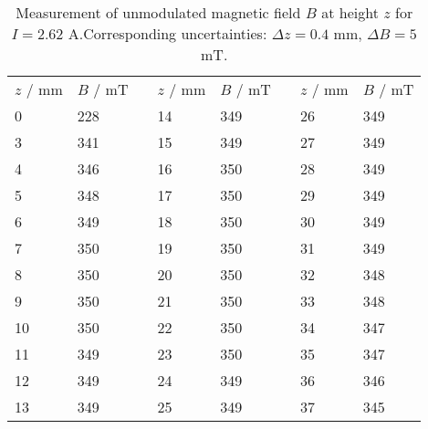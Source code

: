 \begin{table}[htdp]
\centering
    \begin{tabular}{|p{1.34cm}|p{2.16cm}|p{0.8cm}|p{1.34cm}|p{2.16cm}|p{0.8cm}|p{1.34cm}|p{2.16cm}|}
        \cline{1-2}\cline{4-5}\cline{7-8}
        $z$ / mm \cellcolor{LightCyan}& $B$ / mT \cellcolor{LightCyan}&&
        $z$ / mm \cellcolor{LightCyan}& $B$ / mT \cellcolor{LightCyan}&&
        $z$ / mm \cellcolor{LightCyan}& $B$ / mT \cellcolor{LightCyan}\\ 
        \cline{1-2}\cline{4-5}\cline{7-8}
        0 & 228 &&14 & 349 &&26 & 349 \\ 
        3 & 341 &&15 & 349 &&27 & 349 \\ 
        4 & 346 &&16 & 350 &&28 & 349 \\ 
        5 & 348 &&17 & 350 &&29 & 349 \\ 
        6 & 349 &&18 & 350 &&30 & 349 \\ 
        7 & 350 &&19 & 350 &&31 & 349 \\ 
        8 & 350 &&20 & 350 &&32 & 348 \\ 
        9 & 350 &&21 & 350 &&33 & 348 \\ 
        10 & 350 &&22 & 350 &&34 & 347 \\ 
        11 & 349 &&23 & 350 &&35 & 347 \\ 
        12 & 349 &&24 & 349 &&36 & 346 \\ 
        13 & 349 &&25 & 349 &&37 & 345 \\ 
        \cline{1-2}\cline{4-5}\cline{7-8}
    \end{tabular}
    \caption{
        Measurement of unmodulated magnetic field $B$ at height $z$ for $I = 2.62$ A.Corresponding uncertainties: $\Delta z = 0.4$ mm, $\Delta B = 5$ mT.
        }
    \label{tab:b_height}
\end{table}
